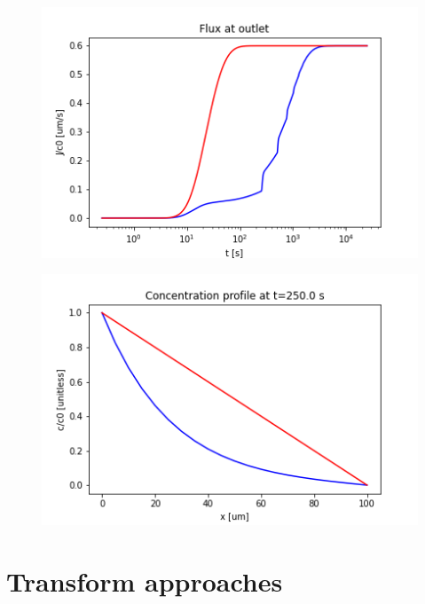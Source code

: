 \documentclass[]{article}
\begin{document}
\begin{figure}
	\centering
	\includegraphics[width=\linewidth]{figs/flux}
	\caption{}
	\label{fig:flux}
\end{figure}

\begin{figure}
	\centering
	\includegraphics[width=\linewidth]{figs/profile999}
	\caption{}
	\label{fig:profile999}
\end{figure}


\appendix
\section{Transform approaches}
\end{document}
